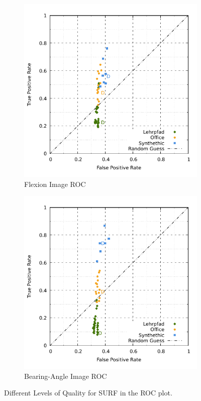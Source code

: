 \begin{figure}[H]
\begin{subfigure}[t]{0.45\linewidth}
    \includegraphics[width=\linewidth]{chapter06/results/SURF/flexion/roc.pdf}%
    \caption{Flexion Image ROC}
\end{subfigure}\quad
\begin{subfigure}[t]{0.45\linewidth}
    \includegraphics[width=\linewidth]{chapter06/results/SURF/bearing/roc.pdf}
    \caption{Bearing-Angle Image ROC}
\end{subfigure}
    \caption{Different Levels of Quality for SURF in the ROC plot.}
\end{figure}

